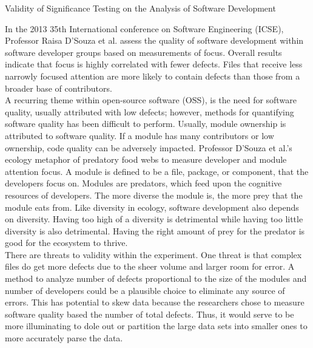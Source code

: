 \documentclass{article}
\begin{document}
    \centerline{Validity of Significance Testing on the Analysis of Software Development}
    \indent In the 2013 35th International conference on Software Engineering (ICSE), Professor Raisa D’Souza et al. assess the quality of software development within software developer groups based on measurements of focus. Overall results indicate that focus is highly correlated with fewer defects. Files that receive less narrowly focused attention are more likely to contain defects than those from a broader base of contributors. \\
    \indent A recurring theme within open-source software (OSS), is the need for software quality, usually attributed with low defects; however, methods for quantifying software quality has been difficult to perform. Usually, module ownership is attributed to software quality. If a module has many contributors or low ownership, code quality can be adversely impacted. Professor D’Souza et al.’s ecology metaphor of predatory food webs to measure developer and module attention focus. A module is defined to be a file, package, or component, that the developers focus on. Modules are predators, which feed upon the cognitive resources of developers. The more diverse the module is, the more prey that the module eats from. Like diversity in ecology, software development also depends on diversity. Having too high of a diversity is detrimental while having too little diversity is also detrimental. Having the right amount of prey for the predator is good for the ecosystem to thrive.
    \\ \indent There are threats to validity within the experiment. One threat is that complex files do get more defects due to the sheer volume and larger room for error. A method to analyze number of defects proportional to the size of the modules and number of developers could be a plausible choice to eliminate any source of errors. This has potential to skew data because the researchers chose to measure software quality based the number of total defects. Thus, it would serve to be more illuminating to dole out or partition the large data sets into smaller ones to more accurately parse the data. 
\end{document}
